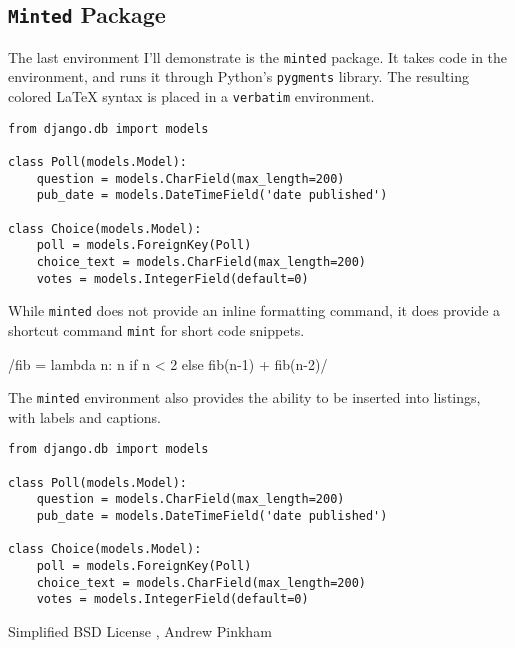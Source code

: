 \subsection{\texttt{Minted} Package}

The last environment I'll demonstrate is the \verb|minted| package. It takes code in the environment, and runs it through Python's \verb|pygments| library. The resulting colored \LaTeX{} syntax is placed in a \verb|verbatim| environment.

\begin{verbatim}
from django.db import models

class Poll(models.Model):
    question = models.CharField(max_length=200)
    pub_date = models.DateTimeField('date published')

class Choice(models.Model):
    poll = models.ForeignKey(Poll)
    choice_text = models.CharField(max_length=200)
    votes = models.IntegerField(default=0)
\end{verbatim}

While \verb|minted| does not provide an inline formatting command, it does provide a shortcut command \verb|mint| for short code snippets.

/fib = lambda n: n if n < 2 else fib(n-1) + fib(n-2)/

The \verb|minted| environment also provides the ability to be inserted into listings, with labels and captions.

\begin{listing}[H]
\begin{verbatim}
from django.db import models

class Poll(models.Model):
    question = models.CharField(max_length=200)
    pub_date = models.DateTimeField('date published')

class Choice(models.Model):
    poll = models.ForeignKey(Poll)
    choice_text = models.CharField(max_length=200)
    votes = models.IntegerField(default=0)
\end{verbatim}
\cprotect\caption{\verb|models.py| from Django Tutorial}
\label{code:django:models_basic_minted}
\end{listing}

\listoflistings

\begin{center}
Simplified BSD License , Andrew Pinkham
 \end{center}


